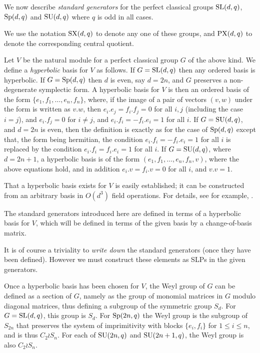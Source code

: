 \documentclass[12pt]{article}
\def\SL{{\rm SL}}
\def\Sp{{\rm Sp}}
\def\SU{{\rm SU}}
\def\SX{{\rm SX}}
\def\PX{{\rm PX}}
\begin{document}
We now describe {\it standard generators} for
the perfect classical groups $\SL(d,q)$, $\Sp(d,q)$ and $\SU(d,q)$
where $q$ is odd in all cases.

We use the notation $\SX(d,q)$ to denote any  one of these 
groups, and $\PX(d,q)$ to denote the corresponding central quotient.

Let $V$ be the natural module for a perfect classical group $G$ of the
above kind.  We define a {\it hyperbolic} basis for $V$ as
follows. If $G=\SL(d,q)$ then any ordered basis is hyperbolic. If
$G=\Sp(d,q)$ then $d$ is even, say $d=2n$, and $G$ preserves a
non-degenerate symplectic form. A hyperbolic basis for $V$ is then an
ordered basis of the form $\{e_1,f_1,\ldots,e_n,f_n\}$, where, if the
image of a pair of vectors $(v,w)$ under the form is written as $v.w$,
then $e_i.e_j=f_i.f_j=0$ for all $i,j$ (including the case $i=j$), and
$e_i.f_j=0$ for $i\ne j$, and $e_i.f_i=-f_i.e_i=1$ for all $i$. If
$G=\SU(d,q)$, and $d=2n$ is even, then the definition is exactly as
for the case of $\Sp(d,q)$ except that, the form being hermitian, the
condition  $e_i.f_i=-f_i.e_i=1$ for all $i$ is replaced by the
condition $e_i.f_i=f_i.e_i=1$ for all $i$. If $G=\SU(d,q)$, where
$d=2n+1$, a hyperbolic basis is of the form
$(e_1,f_1,\ldots,e_n,f_n,v)$, where the above equations hold, and in
addition $e_i.v=f_i.v=0$ for all $i$, and $v.v=1$. 

That a hyperbolic basis exists for $V$ is easily established;
it can be constructed from an arbitrary basis in
$O(d^3)$ field operations. For details, see 
for example, \cite[Chapter 2]{Grove02}.

The standard generators introduced here are defined in terms of
a hyperbolic basis for $V$, which will be defined in terms of the
given basis by a change-of-basis matrix. 

It is of course a triviality to  {\it write down} the standard generators
(once they have been defined).  However we must construct these elements
as SLPs in the given generators.

Once a hyperbolic basis has been chosen for $V$, the Weyl group of $G$
can be defined as a section of $G$, namely as the group of monomial 
matrices in $G$ modulo diagonal
matrices, thus defining a subgroup of the symmetric group $S_d$. For
$G=\SL(d,q)$, this group is $S_d$. For $\Sp(2n,q)$ the Weyl group 
is the subgroup of $S_{2n}$ that preserves the system of imprimitivity with blocks
$\{e_i,f_i\}$ for $1\le i\le n$, and is thus $C_2\wr S_n$. For
each of $\SU(2n,q)$ and $\SU(2n+1,q)$, the Weyl group 
is also $C_2\wr S_n$. 
\end{document}
